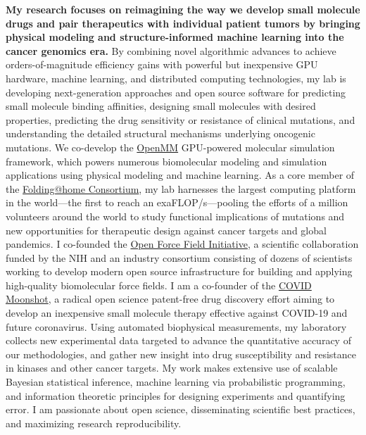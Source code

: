 \documentclass[10pt]{article}
\begin{document}
{\bf My research focuses on reimagining the way we develop small molecule drugs and pair therapeutics with individual patient tumors by bringing physical modeling and structure-informed machine learning into the cancer genomics era.}
By combining novel algorithmic advances to achieve orders-of-magnitude efficiency gains with powerful but inexpensive GPU hardware, machine learning, and distributed computing technologies, my lab is developing next-generation approaches and open source software for predicting small molecule binding affinities, designing small molecules with desired properties, predicting the drug sensitivity or resistance of clinical mutations, and understanding the detailed structural mechanisms underlying oncogenic mutations.
We co-develop the \href{http://openmm.org}{OpenMM} GPU-powered molecular simulation framework, which powers numerous biomolecular modeling and simulation applications using physical modeling and machine learning. 
As a core member of the \href{https://foldingathome.stanford.edu/about/the-foldinghome-consortium/}{Folding@home Consortium}, my lab harnesses the largest computing platform in the world---the first to reach an exaFLOP/s---pooling the efforts of a million volunteers around the world to study functional implications of mutations and new opportunities for therapeutic design against cancer targets and global pandemics.
I co-founded the \href{http://openforcefield.org}{Open Force Field Initiative}, a scientific collaboration funded by the NIH and an industry consortium consisting of dozens of scientists working to develop modern open source infrastructure for building and applying high-quality biomolecular force fields.
I am a co-founder of the \href{http://postera.ai/covid}{COVID Moonshot}, a radical open science patent-free drug discovery effort aiming to develop an inexpensive small molecule therapy effective against COVID-19 and future coronavirus.
Using automated biophysical measurements, my laboratory collects new experimental data targeted to advance the quantitative accuracy of our methodologies, and gather new insight into drug susceptibility and resistance in kinases and other cancer targets.
My work makes extensive use of scalable Bayesian statistical inference, machine learning via probabilistic programming, and information theoretic principles for designing experiments and quantifying error.
I am passionate about open science, disseminating scientific best practices, and maximizing research reproducibility.
\end{document}
